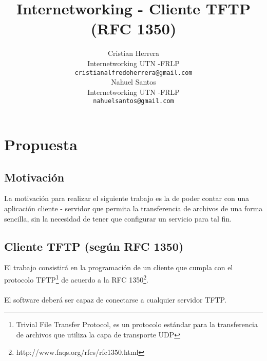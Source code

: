 \documentclass[12pt,a4paper,fleqn]{article}
\title{Internetworking - Cliente TFTP (RFC 1350)}
\author{
		Cristian Herrera\\{\small Internetworking UTN -FRLP}\\{\small \texttt{cristianalfredoherrera@gmail.com}}\\
		Nahuel Santos\\{\small Internetworking UTN -FRLP}\\{\small \texttt{nahuelsantos@gmail.com}}\\
	}
\begin{document}
		\maketitle

		\section{Propuesta}
			\subsection{Motivaci\'on}
				La motivaci\'on para realizar el siguiente trabajo es la de poder contar con una aplicaci\'on cliente - servidor que permita la transferencia de archivos de una forma sencilla, sin la necesidad de tener que configurar un servicio para tal fin.
			\subsection{Cliente TFTP (seg\'un RFC 1350)}
				El trabajo consistir\'a en la programaci\'on de un cliente que cumpla con el protocolo TFTP\footnote{Trivial File Transfer Protocol, es un protocolo est\'andar para la transferencia de archivos que utiliza la capa de transporte UDP} de acuerdo a la RFC 1350\footnote{http://www.faqs.org/rfcs/rfc1350.html}.\\\\
				El software deber\'a ser capaz de conectarse a cualquier servidor TFTP.
\end{document}
